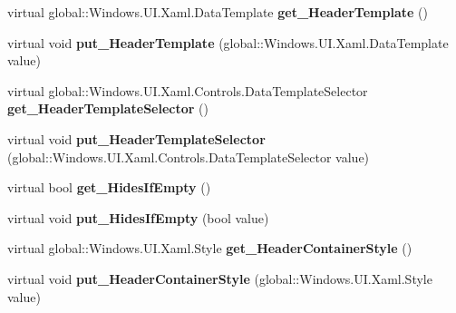 \begin{DoxyCompactItemize}
virtual global\+::\+Windows.\+U\+I.\+Xaml.\+Data\+Template {\bfseries get\+\_\+\+Header\+Template} ()
\item 
\mbox{\label{class_windows_1_1_u_i_1_1_xaml_1_1_controls_1_1_group_style_abe3e5ea2a3be2465b15f097703102cd2}} 
virtual void {\bfseries put\+\_\+\+Header\+Template} (global\+::\+Windows.\+U\+I.\+Xaml.\+Data\+Template value)
\item 
\mbox{\label{class_windows_1_1_u_i_1_1_xaml_1_1_controls_1_1_group_style_a146db53a3fc94e4e3c9433f3c199f1ff}} 
virtual global\+::\+Windows.\+U\+I.\+Xaml.\+Controls.\+Data\+Template\+Selector {\bfseries get\+\_\+\+Header\+Template\+Selector} ()
\item 
\mbox{\label{class_windows_1_1_u_i_1_1_xaml_1_1_controls_1_1_group_style_a3b0221f01ff571dde0bf2c5bd0eeca2d}} 
virtual void {\bfseries put\+\_\+\+Header\+Template\+Selector} (global\+::\+Windows.\+U\+I.\+Xaml.\+Controls.\+Data\+Template\+Selector value)
\item 
\mbox{\label{class_windows_1_1_u_i_1_1_xaml_1_1_controls_1_1_group_style_a3b73f89d90026b986f6e55bc0566aedf}} 
virtual bool {\bfseries get\+\_\+\+Hides\+If\+Empty} ()
\item 
\mbox{\label{class_windows_1_1_u_i_1_1_xaml_1_1_controls_1_1_group_style_aa40a04f641abe85a825e92cf3eb7b442}} 
virtual void {\bfseries put\+\_\+\+Hides\+If\+Empty} (bool value)
\item 
\mbox{\label{class_windows_1_1_u_i_1_1_xaml_1_1_controls_1_1_group_style_a3c12aa3cefaa3b60dc882ca5393ec88f}} 
virtual global\+::\+Windows.\+U\+I.\+Xaml.\+Style {\bfseries get\+\_\+\+Header\+Container\+Style} ()
\item 
\mbox{\label{class_windows_1_1_u_i_1_1_xaml_1_1_controls_1_1_group_style_aab18a3e263942f9bedd80679e89e0fba}} 
virtual void {\bfseries put\+\_\+\+Header\+Container\+Style} (global\+::\+Windows.\+U\+I.\+Xaml.\+Style value)

\end{DoxyCompactItemize}
